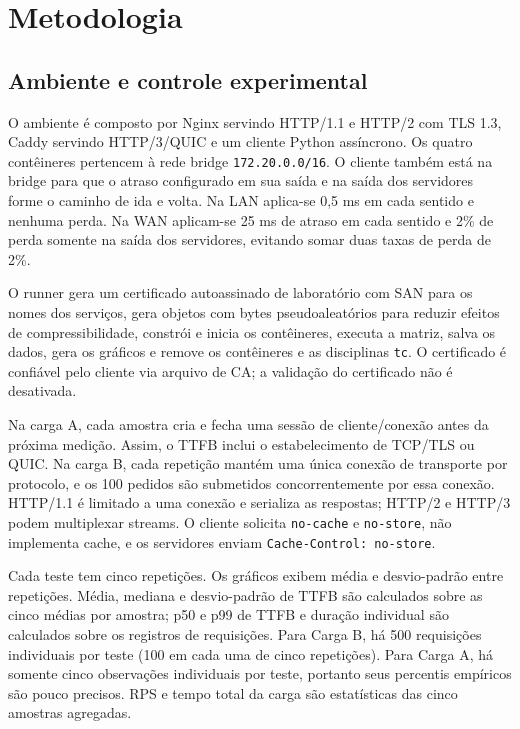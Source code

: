 \documentclass[12pt,a4paper]{article}
\begin{document}
\section{Metodologia}

\subsection{Ambiente e controle experimental}

O ambiente é composto por Nginx servindo HTTP/1.1 e HTTP/2 com TLS 1.3, Caddy servindo
HTTP/3/QUIC e um cliente Python assíncrono. Os quatro contêineres pertencem à rede bridge
\texttt{172.20.0.0/16}. O cliente também está na bridge para que o atraso configurado em sua
saída e na saída dos servidores forme o caminho de ida e volta. Na LAN aplica-se 0,5 ms em
cada sentido e nenhuma perda. Na WAN aplicam-se 25 ms de atraso em cada sentido e 2\% de
perda somente na saída dos servidores, evitando somar duas taxas de perda de 2\%.

O runner gera um certificado autoassinado de laboratório com SAN para os nomes dos serviços,
gera objetos com bytes pseudoaleatórios para reduzir efeitos de compressibilidade, constrói
e inicia os contêineres, executa a matriz, salva os dados, gera os gráficos e remove os
contêineres e as disciplinas \texttt{tc}. O certificado é confiável pelo cliente via arquivo
de CA; a validação do certificado não é desativada.

Na carga A, cada amostra cria e fecha uma sessão de cliente/conexão antes da próxima medição.
Assim, o TTFB inclui o estabelecimento de TCP/TLS ou QUIC. Na carga B, cada repetição mantém
uma única conexão de transporte por protocolo, e os 100 pedidos são submetidos
concorrentemente por essa conexão. HTTP/1.1 é limitado a uma conexão e serializa as respostas;
HTTP/2 e HTTP/3 podem multiplexar streams. O cliente solicita \texttt{no-cache} e
\texttt{no-store}, não implementa cache, e os servidores enviam \texttt{Cache-Control:
no-store}.

Cada teste tem cinco repetições. Os gráficos exibem média e desvio-padrão entre repetições.
Média, mediana e desvio-padrão de TTFB são calculados sobre as cinco médias por amostra;
p50 e p99 de TTFB e duração individual são calculados sobre os registros de requisições.
Para Carga B, há 500 requisições individuais por teste (100 em cada uma de cinco repetições).
Para Carga A, há somente cinco observações individuais por teste, portanto seus percentis
empíricos são pouco precisos. RPS e tempo total da carga são estatísticas das cinco amostras
agregadas.
\end{document}
